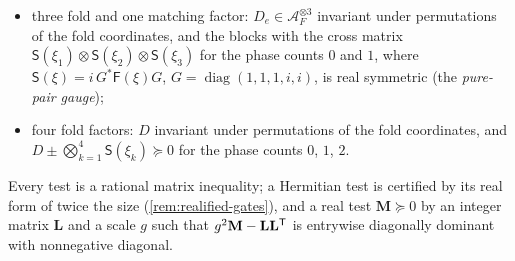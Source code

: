 \begin{lemma}
\begin{enumerate}[label=(\alph*)]
\begin{itemize}
 \item three fold and one matching factor: $D_e\in\mathcal A_F^{\otimes3}$ invariant under
  permutations of the fold coordinates, and the blocks with the cross matrix
  $\mathsf S(\xi_1)\otimes\mathsf S(\xi_2)\otimes\mathsf S(\xi_3)$ for the phase counts $0$ and
  $1$, where $\mathsf S(\xi)=i\,G^*\mathsf F(\xi)G$, $G=\operatorname{diag}(1,1,1,i,i)$, is real
  symmetric (the \emph{pure-pair gauge});
 \item four fold factors: $D$ invariant under permutations of the fold
  coordinates, and $D\pm\bigotimes_{k=1}^4\mathsf S(\xi_k)\succeq0$ for the phase counts
  $0$, $1$, $2$.
 \end{itemize}
\end{enumerate}
Every test is a rational matrix inequality; a Hermitian test is certified by its
real form of twice the size (\cref{rem:realified-gates}), and a real test
$\mathbf M\succeq0$ by an integer matrix $\mathbf L$ and a scale $g$ such that
$g^2\mathbf M-\mathbf L\mathbf L^{\sf T}$ is entrywise diagonally dominant with
nonnegative diagonal.
\end{lemma}

